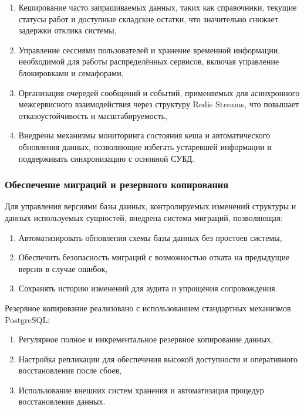 \documentclass[14pt,a4paper]{extarticle}
\begin{document}
\begin{enumerate}
\item Кеширование часто запрашиваемых данных, таких как справочники, текущие статусы работ и доступные складские остатки, что значительно снижает задержки отклика системы,

\item Управление сессиями пользователей и хранение временной информации, необходимой для работы распределённых сервисов, включая управление блокировками и семафорами,

\item Организация очередей сообщений и событий, применяемых для асинхронного межсервисного взаимодействия через структуру Redis Streams, что повышает отказоустойчивость и масштабируемость,

\item Внедрены механизмы мониторинга состояния кеша и автоматического обновления данных, позволяющие избегать устаревшей информации и поддерживать синхронизацию с основной СУБД.
\end{enumerate}

\subsubsection{Обеспечение миграций и резервного копирования}

Для управления версиями базы данных, контролируемых изменений структуры и данных используемых сущностей, внедрена система миграций, позволяющая:

\begin{enumerate}
\item Автоматизировать обновления схемы базы данных без простоев системы,

\item Обеспечить безопасность миграций с возможностью отката на предыдущие версии в случае ошибок,

\item Сохранять историю изменений для аудита и упрощения сопровождения.
\end{enumerate}

Резервное копирование реализовано с использованием стандартных механизмов PostgreSQL:

\begin{enumerate}
\item Регулярное полное и инкрементальное резервное копирование данных,

\item Настройка репликации для обеспечения высокой доступности и оперативного восстановления после сбоев,

\item Использование внешних систем хранения и автоматизация процедур восстановления данных.
\end{enumerate}
\end{document}
